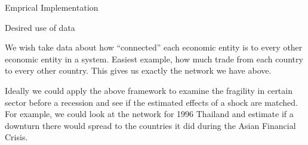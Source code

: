 \documentclass[
  ignorenonframetext,
]{beamer}
\begin{document}
\begin{frame}{Emprical Implementation}
\protect\hypertarget{emprical-implementation}{}

\begin{block}{Desired use of data}

We wish take data about how ``connected'' each economic entity is to
every other economic entity in a system. Easiest example, how much trade
from each country to every other country. This gives us exactly the
network we have above.

Ideally we could apply the above framework to examine the fragility in
certain sector before a recession and see if the estimated effects of a
shock are matched. For example, we could look at the network for 1996
Thailand and estimate if a downturn there would spread to the countries
it did during the Asian Financial Crisis.

\end{block}

\end{frame}
\end{document}
